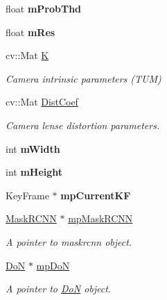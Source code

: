 \begin{DoxyCompactItemize}
\item 
\mbox{\label{classEngine_a30d46eb3926affc633a70e49069d111f}} 
float {\bfseries m\+Prob\+Thd}
\item 
\mbox{\label{classEngine_a915a94d5480ef2870041b5ff5f82ea0e}} 
float {\bfseries m\+Res}
\item 
cv\+::\+Mat \hyperlink{classEngine_a39ebc85b2ec8b863a9a525a4fa4689aa}{K}
\begin{DoxyCompactList}\small\item\em Camera intrinsic parameters (T\+UM) \end{DoxyCompactList}\item 
\mbox{\label{classEngine_a9bddf06ba7cf3410c6b49fc865f1201c}} 
cv\+::\+Mat \hyperlink{classEngine_a9bddf06ba7cf3410c6b49fc865f1201c}{Dist\+Coef}
\begin{DoxyCompactList}\small\item\em Camera lense distortion parameters. \end{DoxyCompactList}\item 
\mbox{\label{classEngine_a08215fba7b1d3b3e9347d40590b5b54b}} 
int {\bfseries m\+Width}
\item 
\mbox{\label{classEngine_a76d3938e3e8b6325ebae501696631d06}} 
int {\bfseries m\+Height}
\item 
\mbox{\label{classEngine_ab05ac5f81adf467caf2d9fb49113d704}} 
Key\+Frame $\ast$ {\bfseries mp\+Current\+KF}
\item 
\mbox{\label{classEngine_ac4c620f056b94de7faf0dfc13010d189}} 
\hyperlink{classMaskRCNN}{Mask\+R\+C\+NN} $\ast$ \hyperlink{classEngine_ac4c620f056b94de7faf0dfc13010d189}{mp\+Mask\+R\+C\+NN}
\begin{DoxyCompactList}\small\item\em A pointer to maskrcnn object. \end{DoxyCompactList}\item 
\mbox{\label{classEngine_a94c02a735a6d30121bff171cbf96e7e1}} 
\hyperlink{classDoN}{DoN} $\ast$ \hyperlink{classEngine_a94c02a735a6d30121bff171cbf96e7e1}{mp\+DoN}
\begin{DoxyCompactList}\small\item\em A pointer to \hyperlink{classDoN}{DoN} object. \end{DoxyCompactList}\item 

\end{DoxyCompactItemize}
